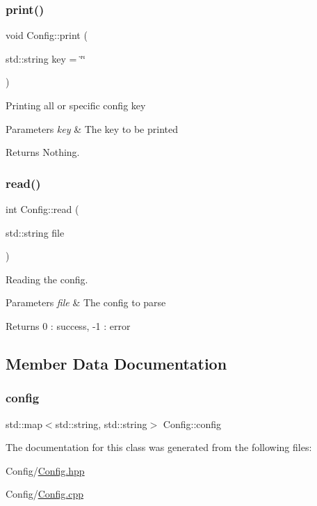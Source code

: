 \subsubsection{\texorpdfstring{print()}{print()}}
{\footnotesize\ttfamily void Config\+::print (\begin{DoxyParamCaption}\item[{std\+::string}]{key = {\ttfamily \char`\"{}\char`\"{}} }\end{DoxyParamCaption})}

Printing all or specific config key 
\begin{DoxyParams}{Parameters}
{\em key} & The key to be printed \\
\hline
\end{DoxyParams}
\begin{DoxyReturn}{Returns}
Nothing. 
\end{DoxyReturn}
\mbox{\label{classConfig_a884554353ee78b567bf7870cd513a014}} 
\subsubsection{\texorpdfstring{read()}{read()}}
{\footnotesize\ttfamily int Config\+::read (\begin{DoxyParamCaption}\item[{std\+::string}]{file }\end{DoxyParamCaption})}

Reading the config. 
\begin{DoxyParams}{Parameters}
{\em file} & The config to parse \\
\hline
\end{DoxyParams}
\begin{DoxyReturn}{Returns}
0 \+: success, -\/1 \+: error 
\end{DoxyReturn}


\subsection{Member Data Documentation}
\mbox{\label{classConfig_ae490b81bf10ac9ac10f12fe35d4474a0}} 
\subsubsection{\texorpdfstring{config}{config}}
{\footnotesize\ttfamily std\+::map$<$std\+::string, std\+::string$>$ Config\+::config\hspace{0.3cm}{\ttfamily [private]}}



The documentation for this class was generated from the following files\+:\begin{DoxyCompactItemize}
\item 
Config/\mbox{\hyperlink{Config_8hpp}{Config.\+hpp}}\item 
Config/\mbox{\hyperlink{Config_8cpp}{Config.\+cpp}}\end{DoxyCompactItemize}
